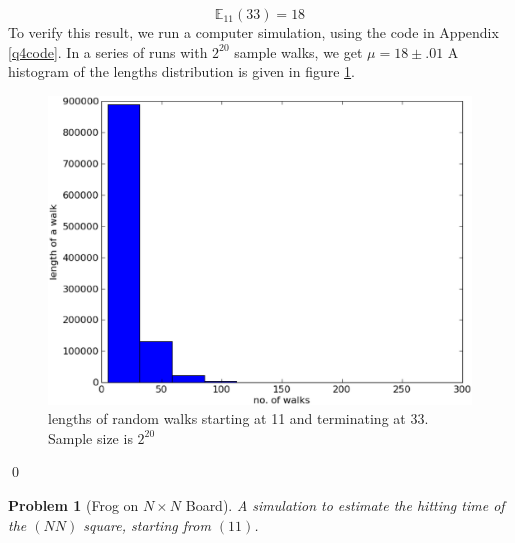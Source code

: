 \documentclass[8pt,notitlepage,twocolumn]{report}
\newtheorem{problem}{Problem}
\newenvironment{solution}[1][Solution]{\begin{trivlist}
    \item[\hskip \labelsep {\bfseries #1}]}{\end{trivlist}}
\begin{document}
\begin{solution}
$$ \mathbb{E}_{11}(33) = 18 $$
To verify this result, we run a computer simulation, using the code in Appendix \ref{q4code}.
In a series of runs with $2^{20}$ sample walks, we get $ \mu = 18 \pm .01 $
A histogram of the lengths distribution is given in figure \ref{qn4afig}. 
\begin{figure}[h]
 \includegraphics[height=.30\textheight]{hw2q4f1.eps}
 \caption{	lengths of random walks starting at 11 and terminating at 33. Sample size is $2^{20}$
   \label{qn4afig}
  }
\end{figure}
\qed
\end{solution}

\begin{problem}[Frog on $N\times N$ Board]
A simulation to estimate the hitting time of the $(NN)$ square, starting from $(11)$.
\end{problem}
\end{document}
